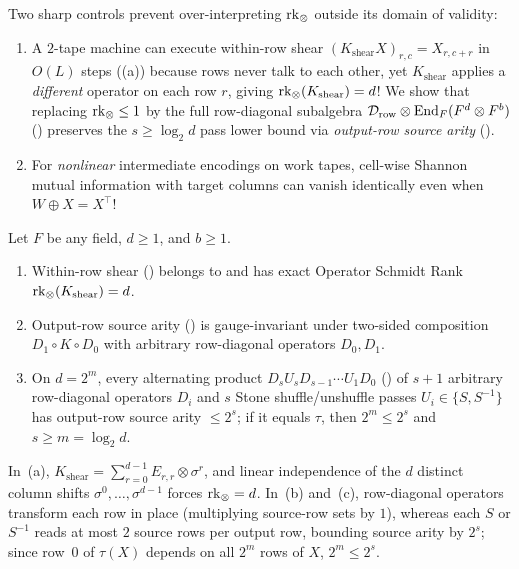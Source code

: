 Two sharp controls prevent over-interpreting $\operatorname{rk}_{\otimes}$ outside its domain of validity:
\begin{enumerate}[label=(\roman*)]
\item A $2$-tape machine can execute within-row shear $(K_{\mathrm{shear}} X)_{r,c} = X_{r, c+r}$
  in $O(L)$ steps ((a)) because rows never talk to each other, yet $K_{\mathrm{shear}}$
  applies a \emph{different} operator on each row $r$, giving $\operatorname{rk}_{\otimes}(K_{\mathrm{shear}}) = d$! We
  show that replacing $\operatorname{rk}_{\otimes} \le 1$ by the full row-diagonal subalgebra
  $\mathcal{D}_{\mathrm{row}} \otimes \operatorname{End}_F(F^d \otimes F^b)$ () preserves
  the $s \ge \log_2 d$ pass lower bound via \emph{output-row source arity}
  ().
\item For \emph{nonlinear} intermediate encodings on work tapes, cell-wise Shannon mutual information
  with target columns can vanish identically even when $W \oplus X = X^\top$!
\end{enumerate}

\begin{proposition}[Row-shear $\OSR = d$ vs.\ row-diagonal gauge invariance]\label{prop:shear-control}
Let $F$ be any field, $d \ge 1$, and $b \ge 1$.
\begin{enumerate}[label=(\alph*)]
\item Within-row shear () belongs to  and has exact
  Operator Schmidt Rank $\operatorname{rk}_{\otimes}(K_{\mathrm{shear}}) = d$.
\item Output-row source arity () is gauge-invariant under two-sided
  composition $D_1 \circ K \circ D_0$ with arbitrary row-diagonal operators $D_0, D_1$.
\item On $d = 2^m$, every alternating product $D_s U_s D_{s-1} \cdots U_1 D_0$
  () of $s + 1$ arbitrary row-diagonal operators $D_i$ and $s$
  Stone shuffle/unshuffle passes $U_i \in \{S, S^{-1}\}$ has output-row source arity $\le 2^s$; if
  it equals $\tau$, then $2^m \le 2^s$ and $s \ge m = \log_2 d$.
\end{enumerate}
\end{proposition}
\begin{outline}
In~(a), $K_{\mathrm{shear}} = \sum_{r=0}^{d-1} E_{r,r} \otimes \sigma^r$, and linear independence of
the $d$ distinct column shifts $\sigma^0, \dots, \sigma^{d-1}$ forces $\OSR = d$. In~(b) and~(c),
row-diagonal operators transform each row in place (multiplying source-row sets by $1$), whereas
each $S$ or $S^{-1}$ reads at most $2$ source rows per output row, bounding source arity by $2^s$;
since row~$0$ of $\tau(X)$ depends on all $2^m$ rows of $X$, $2^m \le 2^s$.
\end{outline}

